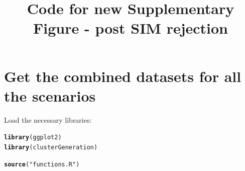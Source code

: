 \documentclass{article}\usepackage[]{graphicx}\usepackage[]{color}
\title{Code for new Supplementary Figure - post SIM rejection}
\makeatletter
\newcommand{\hlstr}[1]{\textcolor[rgb]{0.192,0.494,0.8}{#1}}%
\newcommand{\hlstd}[1]{\textcolor[rgb]{0.345,0.345,0.345}{#1}}%
\newcommand{\hlkwd}[1]{\textcolor[rgb]{0.737,0.353,0.396}{\textbf{#1}}}%
\newenvironment{kframe}{%
 \def\at@end@of@kframe{}%
 \ifinner\ifhmode%
  \def\at@end@of@kframe{\end{minipage}}%
  \begin{minipage}{\columnwidth}%
 \fi\fi%
 \def\FrameCommand##1{\hskip\@totalleftmargin \hskip-\fboxsep
 \colorbox{shadecolor}{##1}\hskip-\fboxsep
     \hskip-\linewidth \hskip-\@totalleftmargin \hskip\columnwidth}%
 \MakeFramed {\advance\hsize-\width
   \@totalleftmargin\z@ \linewidth\hsize
   \@setminipage}}%
 {\par\unskip\endMakeFramed%
 \at@end@of@kframe}
\newenvironment{knitrout}{}{} %
\makeatother
\begin{document}
\maketitle



\section{Get the combined datasets for all the scenarios}

Load the necessary libraries:
\begin{knitrout}
\color{fgcolor}\begin{kframe}
\begin{alltt}
\hlkwd{library}\hlstd{(ggplot2)}
\hlkwd{library}\hlstd{(clusterGeneration)}
\end{alltt}


{\ttfamily\noindent\itshape\color{messagecolor}{\#\# Loading required package: MASS}}\begin{alltt}
\hlkwd{source}\hlstd{(}\hlstr{"functions.R"}\hlstd{)}
\end{alltt}
\end{kframe}
\end{knitrout}
\end{document}
